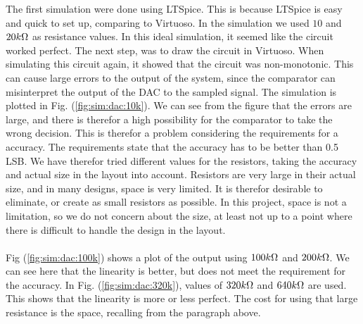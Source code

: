 \documentclass[english, 12pt, a4paper]{ifimaster}
\begin{document}
\newline
The first simulation were done using LTSpice. This is because LTSpice is easy and quick to set up, comparing to Virtuoso. In the simulation we used \(10\) and \(20 k\ohm\) as resistance values. 
In this ideal simulation, it seemed like the circuit worked perfect. The next step, was to draw the circuit in Virtuoso. When simulating this circuit again, it showed that the circuit 
was non-monotonic. This can cause large errors to the output of the system, since the comparator can misinterpret the output of the DAC to the sampled signal. The simulation is plotted in 
Fig. (\ref{fig:sim:dac:10k}). We can see from the figure that the errors are large, and there is therefor a high possibility for the comparator to take the wrong decision. This is therefor a problem
considering the requirements for a accuracy. The requirements state that the accuracy has to be better than 0.5 LSB. We have therefor tried different values for the resistors, taking the accuracy and 
actual size in the layout into account. Resistors are very large in their actual size, and in many designs, space is very limited. It is therefor desirable to eliminate, or create as small resistors 
as possible. In this project, space is not a limitation, so we do not concern about the size, at least not up to a point where there is difficult to handle the design in the layout. \\
\\
Fig (\ref{fig:sim:dac:100k}) shows a plot of the output using \(100 k\ohm\) and \(200 k\ohm\). We can see here that the linearity is better, but does not meet the requirement for the accuracy. In 
Fig. (\ref{fig:sim:dac:320k}), values of \(320 k\ohm\) and \(640 k\ohm\) are used. This shows that the linearity is more or less perfect. The cost for using that large resistance is the space, 
recalling from the paragraph above.  
\end{document}
